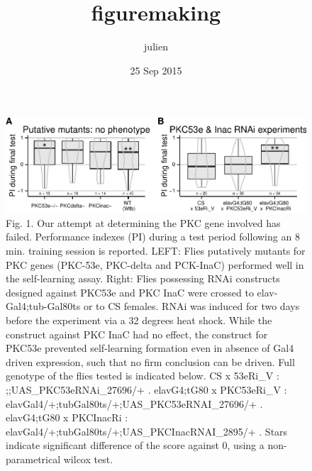 \documentclass[]{article}
\title{figuremaking}
\author{julien}
\date{25 Sep 2015}
\begin{document}
\maketitle


\begin{figure}[htbp]
\centering
\includegraphics{firsttest_files/figure-latex/unnamed-chunk-2-1.pdf}
\caption{Fig. 1. Our attempt at determining the PKC gene involved has
failed. Performance indexes (PI) during a test period following an 8
min. training session is reported. LEFT: Flies putatively mutants for
PKC genes (PKC-53e, PKC-delta and PCK-InaC) performed well in the
self-learning assay. Right: Flies possessing RNAi constructs designed
against PKC53e and PKC InaC were crossed to elav-Gal4;tub-Gal80ts or to
CS females. RNAi was induced for two days before the experiment via a 32
degrees heat shock. While the construct against PKC InaC had no effect,
the construct for PKC53e prevented self-learning formation even in
absence of Gal4 driven expression, such that no firm conclusion can be
driven. Full genotype of the flies tested is indicated below. CS x
53eRi\_V : ;;UAS\_PKC53eRNAi\_27696/+ . elavG4;tG80 x PKC53eRi\_V :
elavGal4/+;tubGal80ts/+;UAS\_PKC53eRNAI\_27696/+ . elavG4;tG80 x
PKCInacRi : elavGal4/+;tubGal80ts/+;UAS\_PKCInacRNAI\_2895/+ . Stars
indicate significant difference of the score against 0, using a
non-parametrical wilcox test.}
\end{figure}
\end{document}
